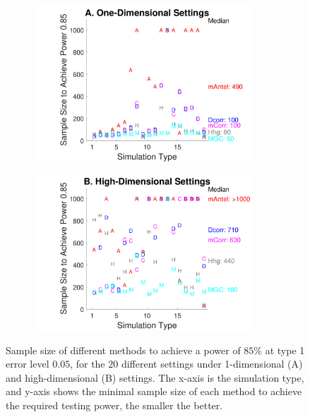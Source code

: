 \documentclass[simplex.tex]{subfiles}
\begin{document}
\begin{figure}[h!]
\begin{cframed}
\centering
\begin{subfigure}[t]{0.45\textwidth}
\includegraphics[width=0.9\textwidth,trim={1.5cm 0 0cm 0cm},clip]{../../figs/Fig1DPowerSummarySize}
\end{subfigure}
\centering
\begin{subfigure}[t]{0.45\textwidth}
\includegraphics[width=0.9\textwidth,trim={1.5cm 0 0cm 0cm},clip]{../../figs/FigHDPowerSummarySize}
\end{subfigure}
    \caption{Sample size of different methods to achieve a power of $85\%$ at type 1 error level $0.05$, for the $20$ different settings under 1-dimensional (A) and high-dimensional (B) settings.
The x-axis is the simulation type, and y-axis shows the minimal sample size of each method to achieve the required testing power, the smaller the better.
}
\end{cframed}
\end{figure}
\end{document}
